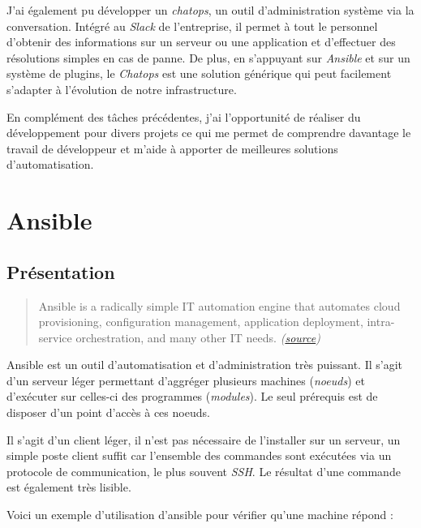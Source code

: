 \bigskip

J'ai également pu développer un \emph{chatops}, un outil
d'administration système via la conversation. Intégré au \emph{Slack} de
l'entreprise, il permet à tout le personnel d'obtenir des informations
sur un serveur ou une application et d'effectuer des résolutions simples
en cas de panne. De plus, en s'appuyant sur \emph{Ansible} et sur un
système de plugins, le \emph{Chatops} est une solution générique qui
peut facilement s'adapter à l'évolution de notre infrastructure.

\bigskip

En complément des tâches précédentes, j'ai l'opportunité de réaliser du
développement pour divers projets ce qui me permet de comprendre
davantage le travail de développeur et m'aide à apporter de meilleures
solutions d'automatisation.

\newpage

\section{Ansible}\label{ansible}

\subsection{Présentation}\label{pruxe9sentation}

\begin{quote}
Ansible is a radically simple IT automation engine that automates cloud
provisioning, configuration management, application deployment,
intra-service orchestration, and many other IT needs.
\emph{(\href{https://www.ansible.com/how-ansible-works}{source})}
\end{quote}

\bigskip
Ansible est un outil d'automatisation et d'administration très puissant.
Il s'agit d'un serveur léger permettant d'aggréger plusieurs machines
(\emph{noeuds}) et d'exécuter sur celles-ci des programmes
(\emph{modules}). Le seul prérequis est de disposer d'un point d'accès à
ces noeuds.

\bigskip

Il s'agit d'un client léger, il n'est pas nécessaire de l'installer sur
un serveur, un simple poste client suffit car l'ensemble des commandes
sont exécutées via un protocole de communication, le plus souvent
\emph{SSH}. Le résultat d'une commande est également très lisible.

\bigskip

Voici un exemple d'utilisation d'ansible pour vérifier qu'une machine
répond :

